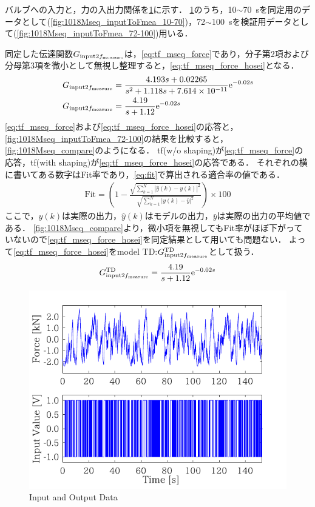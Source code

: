バルブへの入力と，力の入出力関係を\figname\ref{fig:1018Mseq_inputToFmea}に示す．
\figname\ref{fig:1018Mseq_inputToFmea}のうち，10$\sim$\SI{70}{s}を同定用のデータとして(\figname\ref{fig:1018Mseq_inputToFmea_10-70})，72$\sim$\SI{100}{s}を検証用データとして(\figname\ref{fig:1018Mseq_inputToFmea_72-100})用いる．

同定した伝達関数$G_{\mathrm{input}2f_\mathrm{measure}}$は，\eqnname\ref{eq:tf_mseq_force}であり，分子第2項および分母第3項を微小として無視し整理すると，\eqnname\ref{eq:tf_mseq_force_hosei}となる．
\begin{align}
    \label{eq:tf_mseq_force}
    G_{\mathrm{input}2f_\mathrm{measure}}&=\frac{4.193s+0.02265}{s^2 + 1.118s + 7.614\times 10^{-11}}\mathrm{e}^{-0.02s}\\
    \label{eq:tf_mseq_force_hosei} 
    G_{\mathrm{input}2f_\mathrm{measure}}&= \frac{4.19}{s+1.12}\mathrm{e}^{-0.02s}
\end{align}
\eqnname\ref{eq:tf_mseq_force}および\eqnname\ref{eq:tf_mseq_force_hosei}の応答と，\figname\ref{fig:1018Mseq_inputToFmea_72-100}の結果を比較すると，\figname\ref{fig:1018Mseq_compare}のようになる．
tf(w/o shaping)が\eqnname\ref{eq:tf_mseq_force}の応答，tf(with shaping)が\eqnname\ref{eq:tf_mseq_force_hosei}の応答である．
それぞれの横に書いてある数字はFit率であり，\eqnname\ref{eq:fit}で算出される適合率の値である．
\begin{align}
    \label{eq:fit}
    \mathrm{Fit} =  \left( 1- \frac{\sqrt{\sum_{k=1}^N |\hat{y}(k)-y(k)|^2 }}{\sqrt{\sum_{k=1}^N |{y}(k)-\bar{y}|^2 }}\right) \times 100
\end{align}
ここで，$y(k)$は実際の出力，$\hat{y}(k)$はモデルの出力，$\bar{y}$は実際の出力の平均値である．
\figname\ref{fig:1018Mseq_compare}より，微小項を無視してもFit率がほぼ下がっていないので\eqnname\ref{eq:tf_mseq_force_hosei}を同定結果として用いても問題ない．
よって\eqnname\ref{eq:tf_mseq_force_hosei}をmodel TD:$G_{\mathrm{input}2f_\mathrm{measure}}^{\mathrm{TD}}$として扱う．
\begin{align}
    \label{eq:tf_GTDforce}
    G_{\mathrm{input}2f_\mathrm{measure}}^{\mathrm{TD}} = \frac{4.19}{s+1.12}\mathrm{e}^{-0.02s}
\end{align}
\begin{figure}[t]
    \centering
        \includegraphics[keepaspectratio, scale=1.0]{contents/SystemIdentification/figure/1018Mseq_inputToFmea.pdf}
        \caption{Input and Output Data}
        \label{fig:1018Mseq_inputToFmea}
\end{figure}
